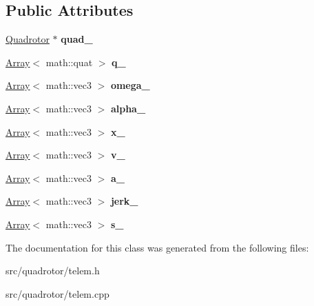 \subsection*{Public Attributes}
\begin{DoxyCompactItemize}
\item 
\hypertarget{classTelem_a56091fc88e4c6bfe0c9781e2e8be8e44}{
\hyperlink{classQuadrotor}{Quadrotor} $\ast$ {\bfseries quad\_\-}}
\label{classTelem_a56091fc88e4c6bfe0c9781e2e8be8e44}

\item 
\hypertarget{classTelem_abdb9ed3d409e996b74909784bf9fd61d}{
\hyperlink{classArray}{Array}$<$ math::quat $>$ {\bfseries q\_\-}}
\label{classTelem_abdb9ed3d409e996b74909784bf9fd61d}

\item 
\hypertarget{classTelem_a0861519483511babb47b0ffdde4cecf4}{
\hyperlink{classArray}{Array}$<$ math::vec3 $>$ {\bfseries omega\_\-}}
\label{classTelem_a0861519483511babb47b0ffdde4cecf4}

\item 
\hypertarget{classTelem_a8bb4ed4b578a7a6d90af8e843fe7f907}{
\hyperlink{classArray}{Array}$<$ math::vec3 $>$ {\bfseries alpha\_\-}}
\label{classTelem_a8bb4ed4b578a7a6d90af8e843fe7f907}

\item 
\hypertarget{classTelem_a59de229401e2fdb33774a18205a3cf71}{
\hyperlink{classArray}{Array}$<$ math::vec3 $>$ {\bfseries x\_\-}}
\label{classTelem_a59de229401e2fdb33774a18205a3cf71}

\item 
\hypertarget{classTelem_a5767a4b818b4e74f7bccd0bdd7dabf08}{
\hyperlink{classArray}{Array}$<$ math::vec3 $>$ {\bfseries v\_\-}}
\label{classTelem_a5767a4b818b4e74f7bccd0bdd7dabf08}

\item 
\hypertarget{classTelem_a49f429c0ed1160d4daf2ba6b55b22369}{
\hyperlink{classArray}{Array}$<$ math::vec3 $>$ {\bfseries a\_\-}}
\label{classTelem_a49f429c0ed1160d4daf2ba6b55b22369}

\item 
\hypertarget{classTelem_ac62fe1671c28ce28b74deb8e94b27c05}{
\hyperlink{classArray}{Array}$<$ math::vec3 $>$ {\bfseries jerk\_\-}}
\label{classTelem_ac62fe1671c28ce28b74deb8e94b27c05}

\item 
\hypertarget{classTelem_a6f6068a9ec367110ed7faa2ddbb1fa6e}{
\hyperlink{classArray}{Array}$<$ math::vec3 $>$ {\bfseries s\_\-}}
\label{classTelem_a6f6068a9ec367110ed7faa2ddbb1fa6e}

\end{DoxyCompactItemize}


The documentation for this class was generated from the following files:\begin{DoxyCompactItemize}
\item 
src/quadrotor/telem.h\item 
src/quadrotor/telem.cpp\end{DoxyCompactItemize}
